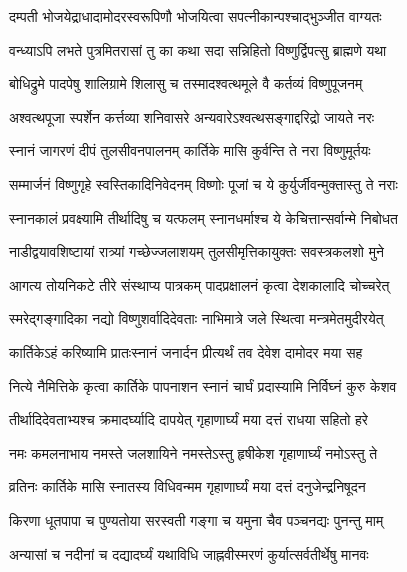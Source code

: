 \twolineshloka
{दम्पती भोजयेद्राधादामोदरस्वरूपिणौ}
{भोजयित्वा सपत्नीकान्पश्चाद्भुञ्जीत वाग्यतः} %

\twolineshloka
{वन्ध्याऽपि लभते पुत्रमितरासां तु का कथा}
{सदा सन्निहितो विष्णुर्द्विपत्सु ब्राह्मणे यथा} %

\twolineshloka
{बोधिद्रुमे पादपेषु शालिग्रामे शिलासु च}
{तस्मादश्वत्थमूले वै कर्तव्यं विष्णुपूजनम्} %

\twolineshloka
{अश्वत्थपूजा स्पर्शेन कर्त्तव्या शनिवासरे}
{अन्यवारेऽश्वत्थसङ्गाद्दरिद्रो जायते नरः} %

\twolineshloka
{स्नानं जागरणं दीपं तुलसीवनपालनम्}
{कार्तिके मासि कुर्वन्ति ते नरा विष्णुमूर्तयः} %

\twolineshloka
{सम्मार्जनं विष्णुगृहे स्वस्तिकादिनिवेदनम्}
{विष्णोः पूजां च ये कुर्युर्जीवन्मुक्तास्तु ते नराः} %

\twolineshloka
{स्नानकालं प्रवक्ष्यामि तीर्थादिषु च यत्फलम्}
{स्नानधर्माश्च ये केचित्तान्सर्वान्मे निबोधत} %






\twolineshloka
{नाडीद्वयावशिष्टायां रात्र्यां गच्छेज्जलाशयम्}
{तुलसीमृत्तिकायुक्तः सवस्त्रकलशो मुने} %

\twolineshloka
{आगत्य तोयनिकटे तीरे संस्थाप्य पात्रकम्}
{पादप्रक्षालनं कृत्वा देशकालादि चोच्चरेत्} %

\twolineshloka
{स्मरेद्गङ्गादिका नद्यो विष्णुशर्वादिदेवताः}
{नाभिमात्रे जले स्थित्वा मन्त्रमेतमुदीरयेत्} %

\twolineshloka
{कार्तिकेऽहं करिष्यामि प्रातःस्नानं जनार्दन}
{प्रीत्यर्थं तव देवेश दामोदर मया सह} %

\twolineshloka
{नित्ये नैमित्तिके कृत्वा कार्तिके पापनाशन}
{स्नानं चार्घं प्रदास्यामि निर्विघ्नं कुरु केशव} %

\twolineshloka
{तीर्थादिदेवताभ्यश्च क्रमादर्घ्यादि दापयेत्}
{गृहाणार्घ्यं मया दत्तं राधया सहितो हरे} %

\twolineshloka
{नमः कमलनाभाय नमस्ते जलशायिने}
{नमस्तेऽस्तु हृषीकेश गृहाणार्घ्यं नमोऽस्तु ते} %

\twolineshloka
{व्रतिनः कार्तिके मासि स्नातस्य विधिवन्मम}
{गृहाणार्घ्यं मया दत्तं दनुजेन्द्रनिषूदन} %

\twolineshloka
{किरणा धूतपापा च पुण्यतोया सरस्वती}
{गङ्गा च यमुना चैव पञ्चनद्यः पुनन्तु माम्} %

\twolineshloka
{अन्यासां च नदीनां च दद्यादर्घ्यं यथाविधि}
{जाह्नवीस्मरणं कुर्यात्सर्वतीर्थेषु मानवः} %

